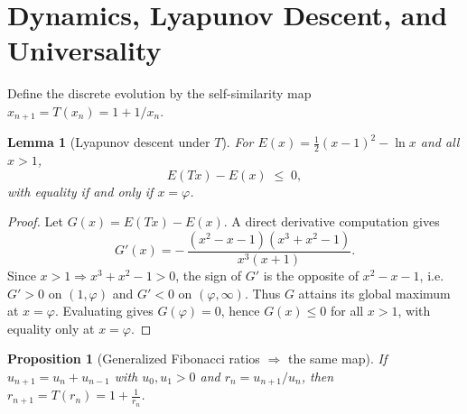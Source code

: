 \documentclass[11pt]{article}
\newtheorem{lemma}{Lemma}
\newtheorem{proposition}{Proposition}
\theoremstyle{remark}
\theoremstyle{definition}
\begin{document}
\section{Dynamics, Lyapunov Descent, and Universality}
Define the discrete evolution by the self-similarity map \(x_{n+1}=T(x_n)=1+1/x_n\).

\begin{lemma}[Lyapunov descent under \(T\)]
\label{lem:descent}
For \(E(x)=\tfrac12(x-1)^2-\ln x\) and all \(x>1\),
\begin{equation}
E(Tx)-E(x)\;\le\;0,
\end{equation}
with equality if and only if \(x=\varphi\).
\end{lemma}
\begin{proof}
Let \(G(x)=E(Tx)-E(x)\). A direct derivative computation gives
\begin{equation}
G'(x)=-\,\frac{(x^2-x-1)(x^3+x^2-1)}{x^3(x+1)}.
\end{equation}
Since \(x>1\Rightarrow x^3+x^2-1>0\), the sign of \(G'\) is the opposite of \(x^2-x-1\), i.e.\ \(G'>0\) on \((1,\varphi)\) and \(G'<0\) on \((\varphi,\infty)\). Thus \(G\) attains its global maximum at \(x=\varphi\). Evaluating gives \(G(\varphi)=0\), hence \(G(x)\le0\) for all \(x>1\), with equality only at \(x=\varphi\).
\end{proof}

\begin{proposition}[Generalized Fibonacci ratios $\Rightarrow$ the same map]
\label{prop:ratios}
If \(u_{n+1}=u_n+u_{n-1}\) with \(u_0,u_1>0\) and \(r_n=u_{n+1}/u_n\), then \(r_{n+1}=T(r_n)=1+\tfrac1{r_n}\).
\end{proposition}
\end{document}
